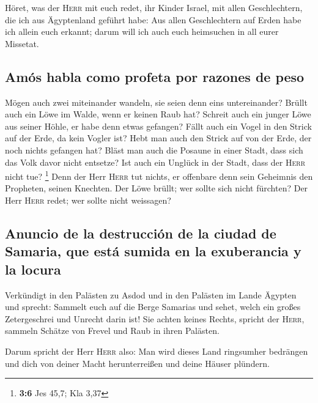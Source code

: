  Höret, was der \textsc{Herr} mit euch redet, ihr Kinder
Israel, mit allen Geschlechtern, die ich aus Ägyptenland geführt habe:
 Aus allen Geschlechtern auf Erden habe ich allein euch
erkannt; darum will ich auch euch heimsuchen in all eurer Missetat.

\hypertarget{amuxf3s-habla-como-profeta-por-razones-de-peso}{%
\subsection{Amós habla como profeta por razones de
peso}\label{amuxf3s-habla-como-profeta-por-razones-de-peso}}

 Mögen auch zwei miteinander wandeln, sie seien denn eins
untereinander?  Brüllt auch ein Löwe im Walde, wenn er
keinen Raub hat? Schreit auch ein junger Löwe aus seiner Höhle, er habe
denn etwas gefangen?  Fällt auch ein Vogel in den Strick
auf der Erde, da kein Vogler ist? Hebt man auch den Strick auf von der
Erde, der noch nichts gefangen hat?  Bläst man auch die
Posaune in einer Stadt, dass sich das Volk davor nicht entsetze? Ist
auch ein Unglück in der Stadt, dass der \textsc{Herr} nicht tue?
\footnote{\textbf{3:6} Jes 45,7; Kla 3,37}  Denn der Herr
\textsc{Herr} tut nichts, er offenbare denn sein Geheimnis den
Propheten, seinen Knechten.  Der Löwe brüllt; wer sollte
sich nicht fürchten? Der Herr \textsc{Herr} redet; wer sollte nicht
weissagen?

\hypertarget{anuncio-de-la-destrucciuxf3n-de-la-ciudad-de-samaria-que-estuxe1-sumida-en-la-exuberancia-y-la-locura}{%
\subsection{Anuncio de la destrucción de la ciudad de Samaria, que está
sumida en la exuberancia y la
locura}\label{anuncio-de-la-destrucciuxf3n-de-la-ciudad-de-samaria-que-estuxe1-sumida-en-la-exuberancia-y-la-locura}}

 Verkündigt in den Palästen zu Asdod und in den Palästen
im Lande Ägypten und sprecht: Sammelt euch auf die Berge Samarias und
sehet, welch ein großes Zetergeschrei und Unrecht darin ist!
 Sie achten keines Rechts, spricht der \textsc{Herr},
sammeln Schätze von Frevel und Raub in ihren Palästen.

 Darum spricht der Herr \textsc{Herr} also: Man wird
dieses Land ringsumher bedrängen und dich von deiner Macht
herunterreißen und deine Häuser plündern.

